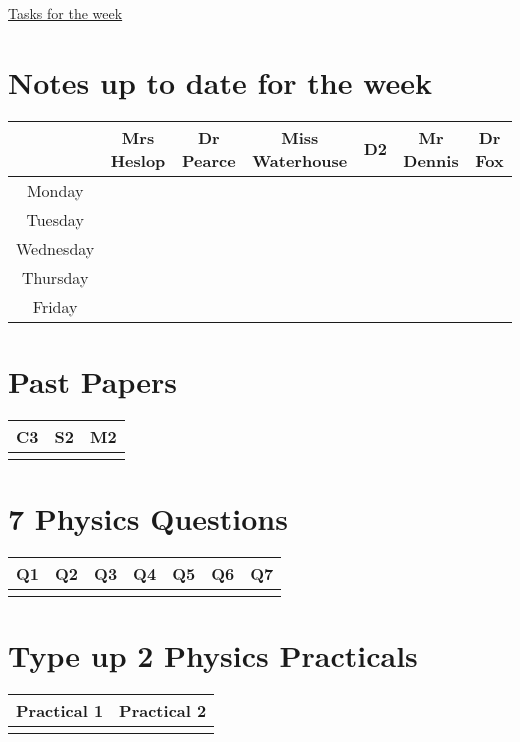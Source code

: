 \documentclass{article}[18pt]
\begin{document}
\begin{center}
\underline{\huge Tasks for the week}
\end{center}
\section{Notes up to date for the week}
{\renewcommand{\arraystretch}{1.2}
\begin{tabular}{ |c|c|c|c|c|c|c| }
\hline
&Mrs Heslop&Dr Pearce&Miss Waterhouse&D2&Mr Dennis&Dr Fox\\
\hline
Monday&&&&&&\\
\hline
Tuesday&&&&&&\\
\hline
Wednesday&&&&&&\\
\hline
Thursday&&&&&&\\
\hline
Friday&&&&&&\\
\hline
\end{tabular}
}
\section{Past Papers}
{\renewcommand{\arraystretch}{1.2}
\begin{tabular}{|c|c|c|}
\hline
C3&S2&M2\\
\hline
&&\\
\hline
\end{tabular}
}
\section{7 Physics Questions}
{\renewcommand{\arraystretch}{1.2}
\begin{tabular}{ |c|c|c|c|c|c|c| }
\hline
Q1&Q2&Q3&Q4&Q5&Q6&Q7\\
\hline
&&&&&&\\
\hline
\end{tabular}
}
\section{Type up 2 Physics Practicals}
{\renewcommand{\arraystretch}{1.2}
\begin{tabular}{ |c|c| }
\hline
Practical 1&Practical 2\\
\hline
&\\
\hline
\end{tabular}
}
\end{document}
